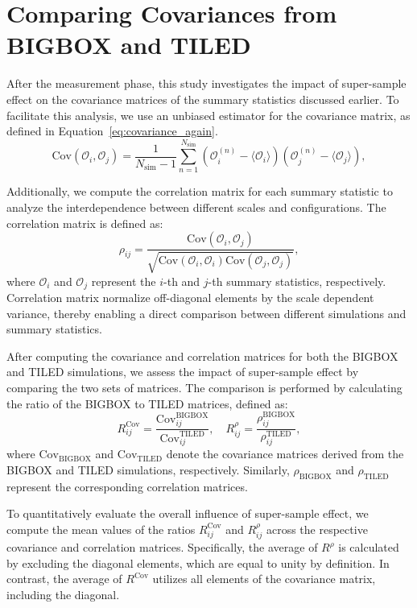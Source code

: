 \section{Comparing Covariances from BIGBOX and TILED}
After the measurement phase, this study investigates the impact of super-sample effect on the covariance matrices of the summary statistics discussed earlier. To facilitate this analysis, we use an unbiased estimator for the covariance matrix, as defined in Equation~\ref{eq:covariance_again}.
\begin{equation}
    \label{eq:covariance_again}
    \mathrm{Cov}(\mathcal{O}_i, \mathcal{O}_j) = \frac{1}{N_{\mathrm{sim}} - 1} \sum_{n=1}^{N_{\mathrm{sim}}} (\mathcal{O}_i^{(n)} - \langle \mathcal{O}_i \rangle) (\mathcal{O}_j^{(n)} - \langle \mathcal{O}_j \rangle),
\end{equation}

Additionally, we compute the correlation matrix for each summary statistic to analyze the interdependence between different scales and configurations. The correlation matrix is defined as:
\begin{equation}
    \rho_{ij} = \frac{\text{Cov}(\mathcal{O}_i, \mathcal{O}_j)}{\sqrt{\text{Cov}(\mathcal{O}_i, \mathcal{O}_i)\text{Cov}(\mathcal{O}_j, \mathcal{O}_j)}},
\end{equation}
where $\mathcal{O}_i$ and $\mathcal{O}_j$ represent the $i$-th and $j$-th summary statistics, respectively. Correlation matrix normalize off-diagonal elements by the scale dependent variance, thereby enabling a direct comparison between different simulations and summary statistics.

After computing the covariance and correlation matrices for both the BIGBOX and TILED simulations, we assess the impact of super-sample effect by comparing the two sets of matrices. The comparison is performed by calculating the ratio of the BIGBOX to TILED matrices, defined as:
\begin{equation}
    R^{\mathrm{Cov}}_{ij} = \frac{\mathrm{Cov}^{\mathrm{BIGBOX}}_{ij}}{\mathrm{Cov}^{\mathrm{TILED}}_{ij}}, \quad R^{\rho}_{ij} = \frac{\rho^{\mathrm{BIGBOX}}_{ij}}{\rho^{\mathrm{TILED}}_{ij}},
\end{equation}
where $\mathrm{Cov}_{\mathrm{BIGBOX}}$ and $\mathrm{Cov}_{\mathrm{TILED}}$ denote the covariance matrices derived from the BIGBOX and TILED simulations, respectively. Similarly, $\rho_{\mathrm{BIGBOX}}$ and $\rho_{\mathrm{TILED}}$ represent the corresponding correlation matrices.

To quantitatively evaluate the overall influence of super-sample effect, we compute the mean values of the ratios $R^{\mathrm{Cov}}_{ij}$ and $R^{\rho}_{ij}$ across the respective covariance and correlation matrices. Specifically, the average of $R^{\rho}$ is calculated by excluding the diagonal elements, which are equal to unity by definition. In contrast, the average of $R^{\mathrm{Cov}}$ utilizes all elements of the covariance matrix, including the diagonal. 

